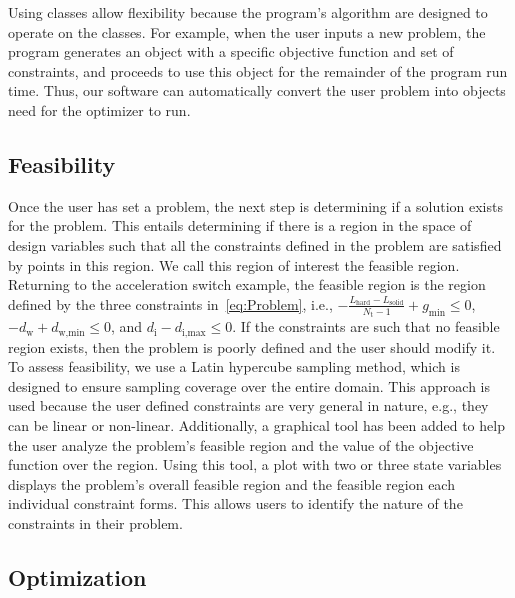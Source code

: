 \documentclass[10pt]{article}
\begin{document}
Using classes allow flexibility because the program's algorithm are designed to operate on the classes. For example, when the user inputs a new problem, the program generates an object with a specific objective function and set of constraints, and proceeds to use this object for the remainder of the program run time. Thus, our software can automatically convert the user problem into objects need for the optimizer to run.

\subsection{Feasibility}
\label{subsec:Feasibility}

Once the user has set a problem, the next step is determining if a solution exists for the problem. This entails determining if there is a region in the space of design variables such that all the constraints defined in the problem are satisfied by points in this region. We call this region of interest the feasible region. Returning to the acceleration switch example, the feasible region is the region defined by the three constraints in~\ref{eq:Problem}, i.e., $-\frac{L_{\text{hard}} - L_{\text{solid}}}{N_{\text{t}} - 1} + g_{\text{min}}\le 0$, $-d_{\text{w}} + d_{\text{w,min}}\le 0$, and $d_{\text{i}} - d_{\text{i,max}} \le 0$. If the constraints are such that no feasible region exists, then the problem is poorly defined and the user should modify it. To assess feasibility, we use a Latin hypercube sampling method, which is designed to ensure sampling coverage over the entire domain. This approach is used because the user defined constraints are very general in nature, e.g., they can be linear or non-linear. 
Additionally, a graphical tool has been added to help the user analyze the problem's feasible region and the value of the objective function over the region. Using this tool, a plot with two or three state variables displays the problem's overall feasible region and the feasible region each individual constraint forms. This allows users to identify the nature of the constraints in their problem.

\subsection{Optimization}
\label{subsec:Optimization}
\end{document}

